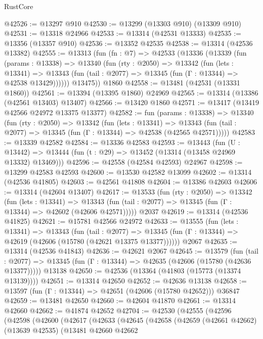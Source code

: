 \begin{lexlean}{RustCore}
\begin{coremodule}
@42526 := @13297 @910
@42530 := @13299 (@13303 @910) (@13309 @910)
@42531 := @13318 @24966
@42533 := @13314 (@42531 @13333)
@42535 := @13356 (@13357 @910)
@42536 := @13352 @42535
@42538 := @13314 (@42536 @13382)
@42555 := @13313
    (fun (fn : @7) =>
    @42533
      (@13336
        (@13339
          (fun (params : @13338) =>
          @13340
            (fun (rty : @2050) =>
            @13342
              (fun (lets : @13341) =>
              @13343 (fun (tail : @2077) => @13345 (fun (Γ : @13344) => @42538 @13429))))))
        @13475))
    @1860
@42558 := @13481 (@42531 (@13331 @1860))
@42561 := @13394 (@13395 @1860) @24969
@42565 := @13314 (@13386 (@42561 @13403) @13407)
@42566 := @13420 @1860
@42571 := @13417 (@13419 @42566 @24972 @13375 @13377)
@42582 := fun (params : @13338) =>
  @13340
    (fun (rty : @2050) =>
    @13342
      (fun (lets : @13341) =>
      @13343 (fun (tail : @2077) => @13345 (fun (Γ : @13344) => @42538 (@42565 @42571)))))
@42583 := @13339 @42582
@42584 := @13336 @42583
@42593 := @13443
    (fun (U : @13442) => @13444 (fun (t : @29) => @13452 (@13314 (@13458 @24969 @13332) @13469)))
@42596 := @42558 (@42584 @42593) @24967
@42598 := @13299 @42583 @42593
@42600 := @13530 @42582 @13099
@42602 := @13314 (@42536 @41805)
@42603 := @42561 @41808
@42604 := @13386 @42603
@42606 := @13314 (@42604 @13407)
@42617 := @13533
    (fun (rty : @2050) =>
    @13342
      (fun (lets : @13341) =>
      @13343 (fun (tail : @2077) => @13345 (fun (Γ : @13344) => @42602 (@42606 @42571)))))
    @2037
@42619 := @13314 (@42536 @41825)
@42621 := @15781 @42566 @24972
@42633 := @13555
    (fun (lets : @13341) =>
    @13343
      (fun (tail : @2077) =>
      @13345 (fun (Γ : @13344) => @42619 (@42606 (@15780 (@42621 @13375 @13377))))))
    @2067
@42635 := @13314 (@42536 @41843)
@42636 := @42621 @2067
@42645 := @13579
    (fun (tail : @2077) => @13345 (fun (Γ : @13344) => @42635 (@42606 (@15780 (@42636 @13377)))))
    @13138
@42650 := @42536 (@13364 (@41803 (@15773 (@13374 @13139))))
@42651 := @13314 @42650
@42652 := @42636 @13138
@42658 := @13597 (fun (Γ : @13344) => @42651 (@42606 (@15780 @42652))) @36847
@42659 := @13481 @42650
@42660 := @42604 @41870
@42661 := @13314 @42660
@42662 := @41874 @42652
@42704 := @42530
    (@42555
      (@42596
        (@42598
          (@42600
            (@42617
              (@42633
                (@42645
                  (@42658
                    (@42659
                      (@42661 @42662)
                      (@13639 @42535)
                      (@13481
                        @42660
                        @42662

\end{coremodule}
\end{lexlean}
